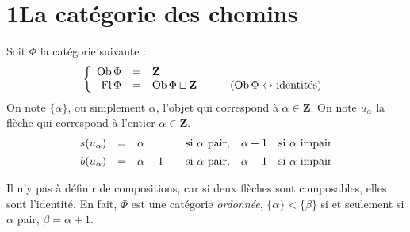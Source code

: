 \clearpage

\printedpage{}

\vspace*{6cm}


\clearpage



\section*{1\quad La catégorie des chemins}

Soit $\Phi$ la catégorie suivante :
\[
\left\{
\begin{array}{rcll}
\mathrm{Ob}\,\Phi & = & \mathbf{Z} & \\
\operatorname{Fl}\Phi & = & \mathrm{Ob}\,\Phi\sqcup\mathbf{Z} & \qquad (\mathrm{Ob}\,\Phi\leftrightarrow\text{identités})
\end{array}
\right.
\]
On note $\{\alpha\}$, ou simplement $\alpha$, l'objet qui correspond à $\alpha\in\mathbf{Z}$. On note $u_\alpha$ la flèche qui correspond à l'entier $\alpha\in\mathbf{Z}$.
\[
\begin{array}{rcl@{\qquad}l@{\quad}l@{\quad}l}
s(u_\alpha) & = & \alpha & \text{si } \alpha \text{ pair}, & \alpha+1 & \text{si } \alpha \text{ impair}\\[1ex]
b(u_\alpha) & = & \alpha+1 & \text{si } \alpha \text{ pair}, & \alpha-1 & \text{si } \alpha \text{ impair}
\end{array}
\]

Il n'y pas à définir de compositions, car si deux flèches sont composables, elles sont l'identité. En fait, $\Phi$ est une catégorie \textit{ordonnée}, $\{\alpha\}<\{\beta\}$ si et seulement si $\alpha$ pair, $\beta=\alpha+1$. %

